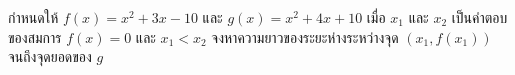 \question กำหนดให้ $f(x) = x^2+3x-10$ และ $g(x) = x^2+4x+10$ เมื่อ $x_1$ และ $x_2$ เป็นคำตอบของสมการ $f(x) = 0$ และ $x_1<x_2$ จงหาความยาวของระยะห่างระหว่างจุด $(x_1,f(x_1))$ จนถึงจุดยอดของ $g$
\newline
{}
